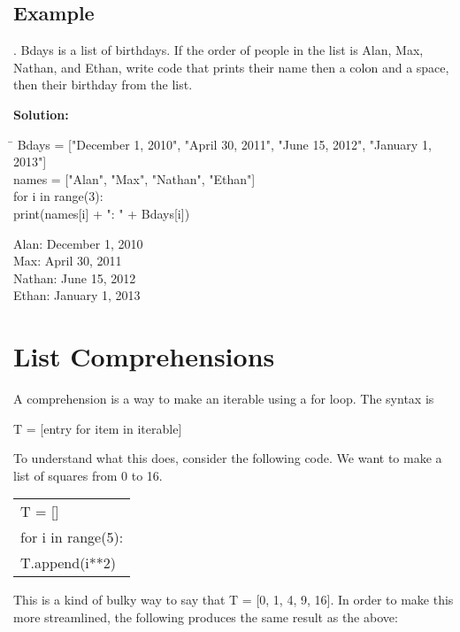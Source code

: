 \documentclass{article}
\newcommand{\define}[1]{\begin{center}\ttfamily #1\end{center}}
\newcommand{\icode}[1]{{\ttfamily #1}}
\newenvironment{code}{\begin{tcolorbox}\ttfamily}{\end{tcolorbox}}
\newenvironment{out}{\begin{tcolorbox}[colback=output]\ttfamily}{\end{tcolorbox}}
\begin{document}
\subsection{Example}
. {\ttfamily Bdays} is a list of birthdays. If the order of people in the list is Alan, Max, Nathan, and Ethan, write code that prints their name then a colon and a space, then their birthday from the list.
\vspace{1 mm}

\noindent\textbf{Solution:}
\begin{code}
	\begin{tabbing}
		\hspace{3.25 in}\=\hspace{3.25 in} \kill
		Bdays = ["December 1, 2010", "April 30, 2011", "June 15, 2012", "January 1, 2013"]\>\\
		names = ["Alan", "Max", "Nathan", "Ethan"]\>\\
		for i in range(3):\>\\
		\hspace{2 em}print(names[i] + ": " + Bdays[i])
	\end{tabbing}
\end{code}
\begin{out}
	Alan: December 1, 2010\\
	Max: April 30, 2011\\
	Nathan: June 15, 2012\\
	Ethan: January 1, 2013
\end{out}
\vspace{.5 cm}

\section{List Comprehensions}
A comprehension is a way to make an iterable using a \icode{for} loop. The syntax is 
\define{T = [entry for item in iterable]}
To understand what this does, consider the following code. We want to make a list of squares from 0 to 16.

\begin{center} \ttfamily
	\begin{tabular}{|l}
		T = []\\
		for i in range(5):\\
		\hspace{2 em}T.append(i**2)
	\end{tabular}
\end{center}
This is a kind of bulky way to say that \icode{T = [0, 1, 4, 9, 16]}. In order to make this more streamlined, the following produces the same result as the above:
\end{document}

